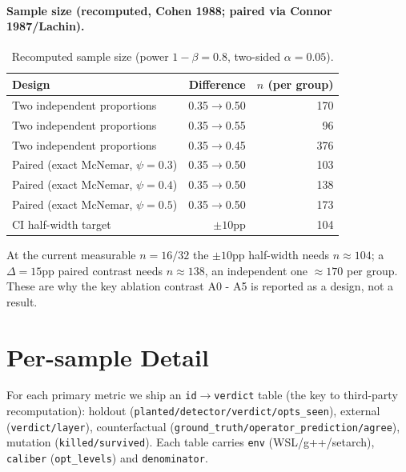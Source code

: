 \documentclass{article}
\begin{document}
\paragraph{Sample size (recomputed, Cohen 1988; paired via Connor 1987/Lachin).}
\begin{table}[h]
\caption{Recomputed sample size (power $1-\beta=0.8$, two-sided $\alpha=0.05$).}
\label{tab:samplesize}
\centering
\small
\begin{tabular}{@{}lrr@{}}
\toprule
Design & Difference & $n$ (per group) \\
\midrule
Two independent proportions & 0.35$\to$0.50 & 170 \\
Two independent proportions & 0.35$\to$0.55 & 96 \\
Two independent proportions & 0.35$\to$0.45 & 376 \\
Paired (exact McNemar, $\psi{=}0.3$) & 0.35$\to$0.50 & 103 \\
Paired (exact McNemar, $\psi{=}0.4$) & 0.35$\to$0.50 & 138 \\
Paired (exact McNemar, $\psi{=}0.5$) & 0.35$\to$0.50 & 173 \\
\midrule
CI half-width target & $\pm10$pp & 104 \\
\bottomrule
\end{tabular}
\end{table}
At the current measurable $n=16/32$ the $\pm10$pp half-width needs $n\approx104$; a $\Delta=15$pp
paired contrast needs $n\approx138$, an independent one $\approx170$ per group. These are why the
key ablation contrast A0 - A5 is reported as a design, not a result.

\section{Per-sample Detail}
\label{app:persample}
For each primary metric we ship an \texttt{id}$\to$\texttt{verdict} table (the key to third-party
recomputation): holdout (\texttt{planted/detector/verdict/opts\_seen}), external
(\texttt{verdict/layer}), counterfactual (\texttt{ground\_truth/operator\_prediction/agree}),
mutation (\texttt{killed/survived}). Each table carries \texttt{env} (WSL/g++/setarch),
\texttt{caliber} (\texttt{opt\_levels}) and \texttt{denominator}.
\end{document}
